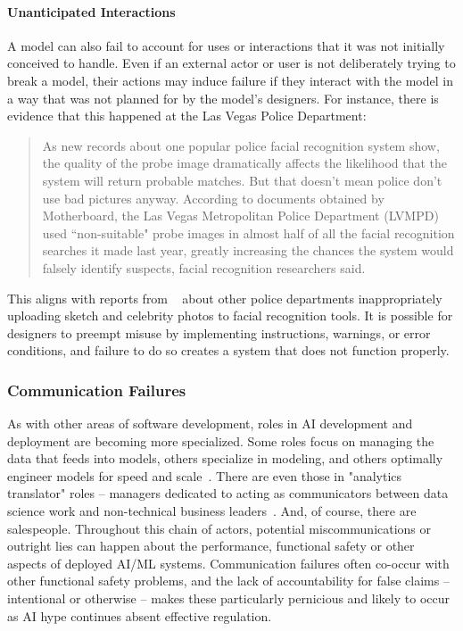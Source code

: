 \documentclass[acmconf,manuscript,screen,natbib=true]{acmart}
\begin{document}
\paragraph{Unanticipated Interactions}

A model can also fail to account for uses or interactions that it was not initially conceived to handle. %
Even if an external actor or user is not deliberately trying to break a model, their actions may induce failure if they interact with the model in a way that was not planned for by the model's designers. 
For instance, there is evidence that this happened at the Las Vegas Police Department:

\blockquote{As new records about one popular police facial recognition system show, the quality of the probe image dramatically affects the likelihood that the system will return probable matches. But that doesn't mean police don't use bad pictures anyway. According to documents obtained by Motherboard, the Las Vegas Metropolitan Police Department (LVMPD) used ``non-suitable" probe images in almost half of all the facial recognition searches it made last year, greatly increasing the chances the system would falsely identify suspects, facial recognition researchers said.~\cite{vegas_pd}}

This aligns with reports from ~\citet{garvie2019garbage} about other police departments inappropriately uploading sketch and celebrity photos to facial recognition tools. It is possible for designers to preempt misuse by implementing instructions, warnings, or error conditions, and failure to do so creates a system that does not function properly.

\subsubsection{Communication Failures}

As with other areas of software development, roles in AI development and deployment are becoming more specialized. Some roles focus on managing the data that feeds into models, others specialize in modeling, and others optimally engineer models for speed and scale~\cite{De_Mauro2018-mi}. There are even those in "analytics translator" roles -- managers dedicated to acting as communicators between data science work and non-technical business leaders~\cite{Henke2018-ua}. And, of course, there are salespeople. Throughout this chain of actors, potential miscommunications or outright lies can happen about the performance, functional safety or other aspects of deployed %
AI/ML systems. Communication failures often co-occur with other functional safety problems, and the lack of accountability for false claims -- intentional or otherwise -- makes these particularly pernicious and likely to occur as AI hype continues absent effective regulation. 
\end{document}
